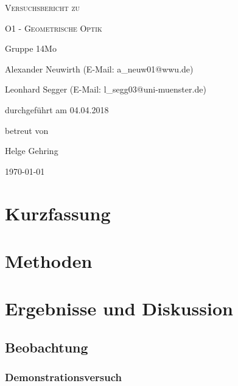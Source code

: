\documentclass[
	a4paper,
	12pt,
	pagesize,
	ngerman
]{scrartcl}
\begin{document}
	
	\begin{titlepage}
		\centering
		{\scshape\LARGE Versuchsbericht zu \par}
		\vspace{1cm}
		{\scshape\huge O1 - Geometrische Optik \par}
		\vspace{2.5cm}
		{\LARGE Gruppe 14Mo \par}
		\vspace{0.5cm}
		
		{\large Alexander Neuwirth (E-Mail: a\_neuw01@wwu.de) \par}
		{\large Leonhard Segger (E-Mail: l\_segg03@uni-muenster.de) \par}
		\vfill
		
		durchgeführt am 04.04.2018\par
		betreut von\par
		{\large Helge Gehring} 
		
		\vfill
		
		{\large \today\par}
	\end{titlepage}
	\tableofcontents
	\newpage


	\section{Kurzfassung}
	
	\section{Methoden}
	
	\section{Ergebnisse und Diskussion}
	

	\subsection{Beobachtung}
	\subsubsection{Demonstrationsversuch}
\end{document}
